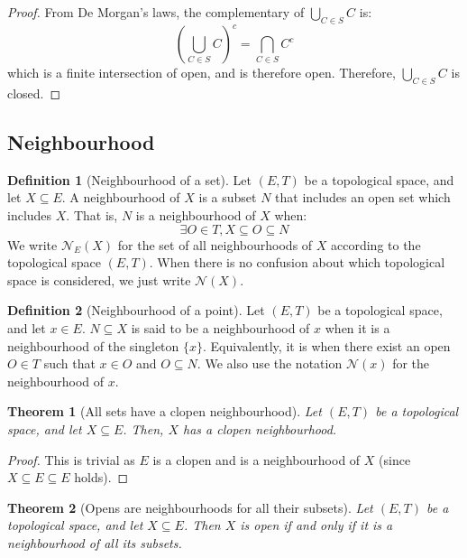 \documentclass{article}
\newtheorem{theorem}{Theorem}[section]
\theoremstyle{definition}
\newtheorem{definition}{Definition}[section]
\theoremstyle{remark}
\theoremstyle{example}
\theoremstyle{notation}
\begin{document}
\begin{proof}
		From De Morgan's laws, the complementary of $\bigcup_{C \in S} C$ is:
				$$(\bigcup_{C \in S} C)^c = \bigcap_{C \in S} C^c$$
		which is a finite intersection of open, and is therefore open. Therefore, $\bigcup_{C \in S} C$ is closed.
\end{proof}

\subsection{Neighbourhood}

\begin{definition}[Neighbourhood of a set]
		Let $(E, T)$ be a topological space, and let $X \subseteq E$. A neighbourhood of $X$ is a subset $N$ that includes an open set which includes $X$. That is, $N$ is a neighbourhood of $X$ when:
				$$\exists O \in T, X \subseteq O \subseteq N$$
		We write $\mathcal{N}_E(X)$ for the set of all neighbourhoods of $X$ according to the topological space $(E, T)$. When there is no confusion about which topological space is considered, we just write $\mathcal{N}(X)$.
\end{definition}

\begin{definition}[Neighbourhood of a point]
		Let $(E, T)$ be a topological space, and let $x \in E$. $N \subseteq X$ is said to be a neighbourhood of $x$ when it is a neighbourhood of the singleton $\{x\}$. Equivalently, it is when there exist an open $O \in T$ such that $x \in O$ and $O \subseteq N$. We also use the notation $\mathcal{N}(x)$ for the neighbourhood of $x$.
\end{definition}

\begin{theorem}[All sets have a clopen neighbourhood] \label{thm:neighbourhood-existence}
		Let $(E, T)$ be a topological space, and let $X \subseteq E$. Then, $X$ has a clopen neighbourhood.
\end{theorem}

\begin{proof}
		This is trivial as $E$ is a clopen and is a neighbourhood of $X$ (since $X \subseteq E \subseteq E$ holds).
\end{proof}

\begin{theorem}[Opens are neighbourhoods for all their subsets] \label{thm:open-eq-neighbourhood}
		Let $(E, T)$ be a topological space, and let $X \subseteq E$. Then $X$ is open if and only if it is a neighbourhood of all its subsets.
\end{theorem}
\end{document}
